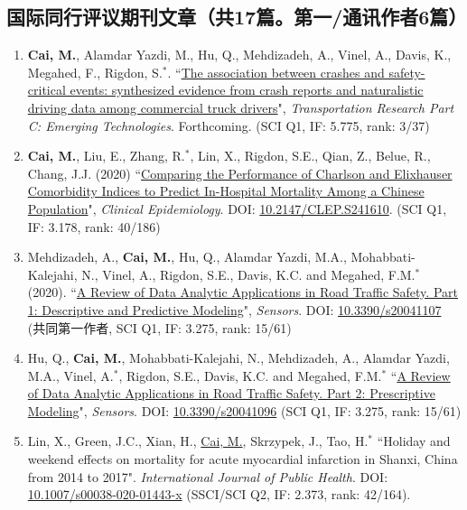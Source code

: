 \documentclass[11pt, a4paper]{article}
\newcommand{\years}[1]{\marginnote{\scriptsize #1}}
\begin{document}
	\subsection*{国际同行评议期刊文章（共17篇。第一/通讯作者6篇）}
	\begin{enumerate}[leftmargin=0ex,itemsep=1ex]
		\item \years{2020}\textcolor{RubineRed}{\textbf{Cai, M.}}, Alamdar Yazdi, M., Hu, Q., Mehdizadeh, A., Vinel, A., Davis, K., Megahed, F., Rigdon, S.$^\ast$. ``\ul{The association between crashes and safety-critical events: synthesized evidence from crash reports and naturalistic driving data among commercial truck drivers}", \emph{Transportation Research Part C: Emerging Technologies}. Forthcoming. (SCI Q1, IF: 5.775, rank: 3/37)
		
		\item \textcolor{RubineRed}{\textbf{Cai, M.}}, Liu, E., Zhang, R.$^\ast$, Lin, X., Rigdon, S.E., Qian, Z., Belue, R., Chang, J.J. (2020) ``\ul{Comparing the Performance of Charlson and Elixhauser Comorbidity Indices to Predict In-Hospital Mortality Among a Chinese Population}", \emph{Clinical Epidemiology}. DOI: \href{https://doi.org/10.2147/CLEP.S241610}{10.2147/CLEP.S241610}. (SCI Q1, IF: 3.178, rank: 40/186)
		
		\item Mehdizadeh, A., \textcolor{RubineRed}{\textbf{Cai, M.}}, Hu, Q., Alamdar Yazdi, M.A., Mohabbati-Kalejahi, N., Vinel, A., Rigdon, S.E., Davis, K.C. and Megahed, F.M.$^\ast$ (2020). ``\ul{A Review of Data Analytic Applications in Road Traffic Safety. Part 1: Descriptive and Predictive Modeling}", \emph{Sensors}. DOI: \href{https://doi.org/10.3390/s20041107}{10.3390/s20041107} (共同第一作者, SCI Q1, IF: 3.275, rank: 15/61)
		
		\item Hu, Q., \textbf{Cai, M.}, Mohabbati-Kalejahi, N., Mehdizadeh, A., Alamdar Yazdi, M.A., Vinel, A.$^\ast$, Rigdon, S.E., Davis, K.C. and Megahed, F.M.$^\ast$ ``\ul{A Review of Data Analytic Applications in Road Traffic Safety. Part 2: Prescriptive Modeling}", \emph{Sensors}. DOI: \href{https://doi.org/10.3390/s20041096}{10.3390/s20041096} (SCI Q1, IF: 3.275, rank: 15/61)

		\item Lin, X., Green, J.C., Xian, H., \underline{Cai, M.}, Skrzypek, J., Tao, H.$^\ast$ ``Holiday and weekend effects on mortality for acute myocardial infarction in Shanxi, China from 2014 to 2017". \emph{International Journal of Public Health}.  DOI: \href{https://doi.org/10.1007/s00038-020-01443-x}{10.1007/s00038-020-01443-x} (SSCI/SCI Q2, IF: 2.373, rank: 42/164).
		

\end{enumerate}
\end{document}
